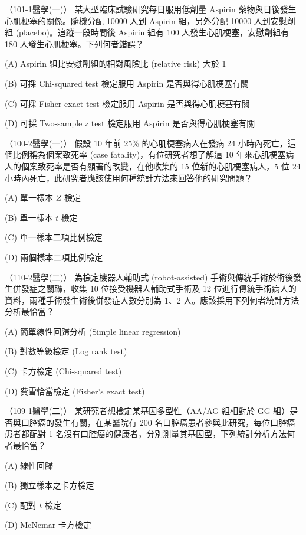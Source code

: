     \begin{docexam}{（101-1醫學(一)）}
        某大型臨床試驗研究每日服用低劑量 Aspirin 藥物與日後發生心肌梗塞的關係。隨機分配 10000 人到 Aspirin 組，另外分配 10000 人到安慰劑組 (placebo)。追蹤一段時間後 Aspirin 組有 100 人發生心肌梗塞，安慰劑組有 180 人發生心肌梗塞。下列何者錯誤？
        
        (A) Aspirin 組比安慰劑組的相對風險比 (relative risk) 大於 1
        
        (B) 可採 Chi-squared test 檢定服用 Aspirin 是否與得心肌梗塞有關

        (C) 可採 Fisher exact test 檢定服用 Aspirin 是否與得心肌梗塞有關
 
        (D) 可採 Two-sample z test 檢定服用 Aspirin 是否與得心肌梗塞有關
    \end{docexam}
    
    \begin{docexam}{（100-2醫學(一)）}
        假設 10 年前 25\% 的心肌梗塞病人在發病 24 小時內死亡，這個比例稱為個案致死率 (case fatality)，有位研究者想了解這 10 年來心肌梗塞病人的個案致死率是否有顯著的改變，在他收集的 15 位新的心肌梗塞病人，5 位 24 小時內死亡，此研究者應該使用何種統計方法來回答他的研究問題？
        
        (A) 單一樣本 $Z$ 檢定
        
        (B) 單一樣本 $t$ 檢定

        (C) 單一樣本二項比例檢定
 
        (D) 兩個樣本二項比例檢定
    \end{docexam}
    
    \begin{docexam}{（110-2醫學(二)）}
        為檢定機器人輔助式 (robot-assisted) 手術與傳統手術於術後發生併發症之關聯，收集 10 位接受機器人輔助式手術及 12 位進行傳統手術病人的資料，兩種手術發生術後併發症人數分別為 1、2 人。應該採用下列何者統計方法分析最恰當？
        
        (A) 簡單線性回歸分析 (Simple linear regression)
        
        (B) 對數等級檢定 (Log rank test)

        (C) 卡方檢定 (Chi-squared test)
 
        (D) 費雪恰當檢定 (Fisher's exact test)
    \end{docexam}
    
    \begin{docexam}{（109-1醫學(二)）}
        某研究者想檢定某基因多型性（AA/AG 組相對於 GG 組）是否與口腔癌的發生有關，在某醫院有 200 名口腔癌患者參與此研究，每位口腔癌患者都配對 1 名沒有口腔癌的健康者，分別測量其基因型，下列統計分析方法何者最恰當？
        
        (A) 線性回歸
        
        (B) 獨立樣本之卡方檢定

        (C) 配對 $t$ 檢定
 
        (D) McNemar 卡方檢定
    \end{docexam}
    
